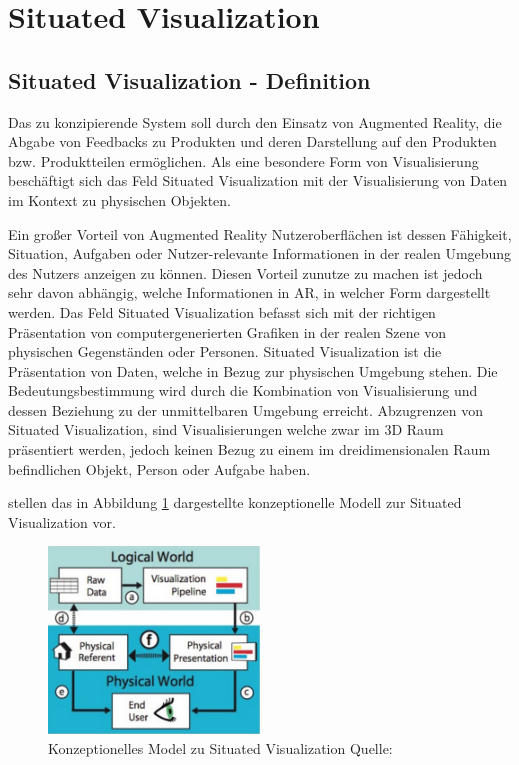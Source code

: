 \section{Situated Visualization}
\subsection{Situated Visualization - Definition}


Das zu konzipierende System soll durch den Einsatz von Augmented Reality, die Abgabe von Feedbacks zu Produkten und deren Darstellung auf den Produkten bzw. Produktteilen ermöglichen. 
Als eine besondere Form von Visualisierung beschäftigt sich das Feld Situated Visualization mit der Visualisierung von Daten im Kontext zu physischen Objekten. 

\cite[S.~239]{DieterSchmalstieg2016} Ein großer Vorteil von Augmented Reality Nutzeroberflächen ist dessen Fähigkeit, Situation, Aufgaben oder Nutzer-relevante Informationen in 
der realen Umgebung des Nutzers anzeigen zu können. Diesen Vorteil zunutze zu machen ist jedoch sehr davon abhängig, welche Informationen in AR, in welcher Form dargestellt werden. 
Das Feld Situated Visualization befasst sich mit der richtigen Präsentation von computergenerierten Grafiken in der realen Szene von physischen Gegenständen oder Personen. \cite[S.~188]{Marriott2018} Situated Visualization ist die Präsentation von Daten, welche in Bezug zur physischen Umgebung stehen. 
Die Bedeutungsbestimmung wird durch die Kombination von Visualisierung und dessen Beziehung zu der unmittelbaren Umgebung erreicht. \cite[S.~240]{DieterSchmalstieg2016} Abzugrenzen von 
Situated Visualization, sind Visualisierungen welche zwar im 3D Raum präsentiert werden, jedoch keinen Bezug zu einem im dreidimensionalen Raum befindlichen Objekt, Person oder Aufgabe haben.

\cite[S.~192]{Marriott2018} \cite[S.~2]{Willett2017} stellen das in Abbildung \ref{img:situated_visualization_concept} dargestellte konzeptionelle Modell 
zur Situated Visualization vor.

\begin{figure}[H]
	\centering
	\includegraphics[width=0.5\textwidth]{resources/fundamentals/situated_visualization/spacially_situated_visualization_model.png}
	\caption{Konzeptionelles Model zu Situated Visualization Quelle: \cite[S.~192]{Marriott2018}}
	\label{img:situated_visualization_concept}
\end{figure}

